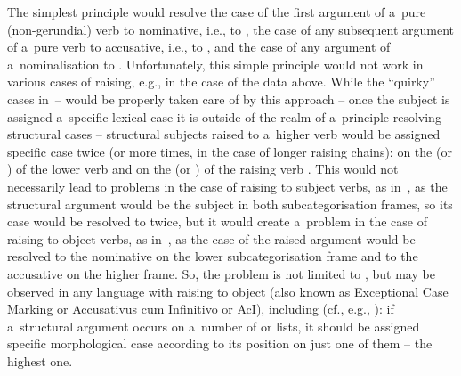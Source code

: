 \documentclass[output=paper
 	        ,biblatex
                ,babelshorthands
                ,newtxmath
                ,draftmode
                ,colorlinks, citecolor=brown
]{langscibook}
\begin{document}
The simplest principle would resolve the case of the first  argument of a~pure (non-gerundial) verb to nominative, i.e., to , the case of any subsequent  argument of a~pure verb to accusative, i.e., to , and the case of any  argument of a~nominalisation to .  Unfortunately, this simple principle would not work in various cases of raising, e.g., in the case of the  data above.  While the “quirky” cases in~– would be properly taken care of by this approach – once the subject is assigned a~specific lexical case it is outside of the realm of a~principle resolving structural cases – structural subjects raised to a~higher verb would be assigned specific case twice (or more times, in the case of longer raising chains): on the  (or ) of the lower verb and on the  (or ) of the raising verb .  This would not necessarily lead to problems in the case of raising to subject verbs, as in~, as the structural argument would be the subject in both subcategorisation frames, so its case would be resolved to  twice, but it would create a~problem in the case of raising to object verbs, as in~, as the case of the raised argument would be resolved to the nominative on the lower subcategorisation frame and to the accusative on the higher frame.  So, the problem is not limited to , but may be observed in any language with raising to object (also known as Exceptional Case Marking or Accusativus cum Infinitivo or AcI), including  (cf., e.g., \citealt[231]{HM94a}): if a~structural argument occurs on a~number of  or  lists, it should be assigned specific morphological case according to its position on just one of them – the highest one.
\end{document}
